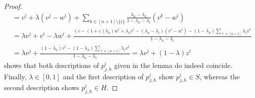\documentclass{amsart}
\begin{document}
\begin{proof}
\begin{align*}
	& = v^i + \lambda (v^j - w^i) + \sum_{k \in [n+1] \setminus \{i\}} \frac{\lambda_h - \lambda_k}{1 - \lambda_h - \lambda_i} (v^k - w^i)
    \\
	& = \lambda v^j + v^i - \lambda w^i + \frac{(\varepsilon - (1 + \varepsilon) \lambda_h) w^i + \lambda_h v^i - (\lambda_h - \lambda_i) (v^i - w^i)  - (1 - \lambda_h) \sum_{\ell \in [n+1]} \lambda_\ell v^\ell}{1 - \lambda_h - \lambda_i}
    \\
	& = \lambda v^j + \frac{(1 - \lambda_h) v^i - (1 - \lambda_h) \sum_{\ell \in [n+1]} \lambda_\ell v^\ell}{1 - \lambda_h - \lambda_i}
	= \lambda v^j + (1 - \lambda) z^i
\end{align*}
shows that both descriptions of $p^i_{j,h}$ given in the lemma do indeed coincide.
Finally, $\lambda \in [0,1]$ and the first description of $p^i_{j,h}$ show $p^i_{j,h} \in S$,
whereas the second description shows $p^i_{j,h} \in H$.
\end{proof}
\end{document}

